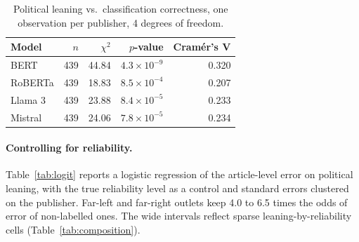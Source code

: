 \documentclass[11pt,a4paper]{article}
\begin{document}
\begin{table}[ht]
\centering
\begin{tabular}{lrrrr}
\toprule
\textbf{Model} & \textbf{$n$} & \textbf{$\chi^2$} & \textbf{$p$-value} & \textbf{Cramér's V} \\
\midrule
BERT    & 439 & 44.84 & $4.3\times10^{-9}$ & 0.320 \\
RoBERTa & 439 & 18.83 & $8.5\times10^{-4}$ & 0.207 \\
Llama 3 & 439 & 23.88 & $8.4\times10^{-5}$ & 0.233 \\
Mistral & 439 & 24.06 & $7.8\times10^{-5}$ & 0.234 \\
\bottomrule
\end{tabular}
\caption{Political leaning vs.\ classification correctness, one observation per publisher, 4 degrees of freedom.}
\label{tab:chi2_pub}
\end{table}

\paragraph{Controlling for reliability.}
Table~\ref{tab:logit} reports a logistic regression of the article-level error on political leaning, with the true reliability level as a control and standard errors clustered on the publisher. Far-left and far-right outlets keep 4.0 to 6.5 times the odds of error of non-labelled ones. The wide intervals reflect sparse leaning-by-reliability cells (Table~\ref{tab:composition}).
\end{document}
